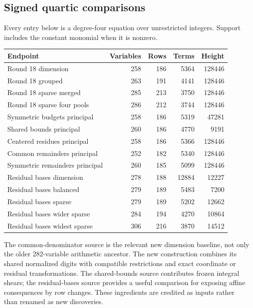 \subsection{Signed quartic comparisons}
Every entry below is a degree-four equation over unrestricted integers.
Support includes the constant monomial when it is nonzero.
\begin{center}\small
\begin{tabular}{@{}lrrrr@{}}\toprule
Endpoint & Variables & Rows & Terms & Height\\\midrule
Round 18 dimension &258&186&5364&128446\\
Round 18 grouped &263&191&4141&128446\\
Round 18 sparse merged &285&213&3750&128446\\
Round 18 sparse four pools &286&212&3744&128446\\\midrule
Symmetric budgets principal &258&186&5319&47281\\
Shared bounds principal &260&186&4770&9191\\
Centered residues principal &258&186&5366&128446\\
Common remainders principal &252&182&5340&128446\\
Symmetric remainders principal &260&185&5099&128446\\
Residual bases dimension &278&188&12884&12227\\
Residual bases balanced &279&189&5483&7200\\
Residual bases sparse &279&189&5202&12662\\
Residual bases wider sparse &284&194&4270&10864\\
Residual bases widest sparse &306&216&3870&14512\\\bottomrule
\end{tabular}
\end{center}
The common-denominator source is the relevant new dimension baseline, not
only the older 282-variable arithmetic ancestor. The new construction
combines its shared normalized digits with compatible restrictions and exact
coordinate or residual transformations. The shared-bounds source contributes
frozen integral shears; the residual-bases source provides a useful comparison
for exposing affine consequences by row changes. These ingredients are
credited as inputs rather than renamed as new discoveries.



